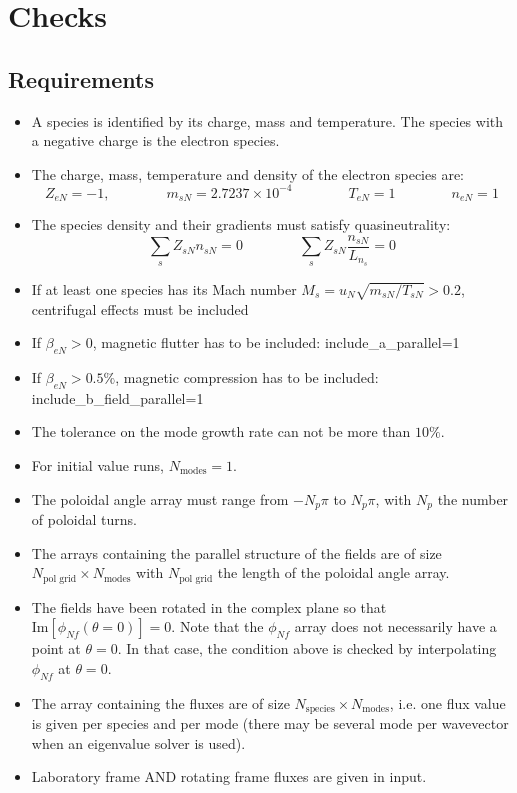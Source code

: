 \documentclass[a4paper]{report}
\begin{document}
\section{Checks}
\subsection{Requirements}
\begin{itemize}
\item A species is identified by its charge, mass and temperature. The species with a negative charge is the electron species.
\item The charge, mass, temperature and density of the electron species are:
\begin{equation}
 Z_{eN}=-1, \qquad \qquad m_{sN} = 2.7237\times 10^{-4} \qquad \qquad T_{eN}=1 \qquad \qquad n_{eN}=1
\end{equation}
\item The species density and their gradients must satisfy quasineutrality:
\begin{equation}
 \sum_s Z_{sN}n_{sN} = 0 \qquad \qquad \sum_s Z_{sN}\frac{n_{sN}}{L_{n_s}}=0
\end{equation}
\item If at least one species has its Mach number $M_s=u_N\sqrt{m_{sN}/T_{sN}}>0.2$, centrifugal effects must be included
\item If $\beta_{eN}>0$, magnetic flutter has to be included: include\_a\_parallel=1
\item If $\beta_{eN}>0.5\%$, magnetic compression has to be included: include\_b\_field\_parallel=1
\item The tolerance on the mode growth rate can not be more than $10\%$.
\item For initial value runs, $N_\textrm{modes}=1$.
\item The poloidal angle array must range from $-N_p \pi$ to $N_p \pi$, with $N_p$ the number of poloidal turns.
\item The arrays containing the parallel structure of the fields are of size $N_\textrm{pol grid}\times N_\textrm{modes}$ with $N_\textrm{pol grid}$ the length of the poloidal angle array.
\item The fields have been rotated in the complex plane so that $\textrm{Im}\left[\phi_{Nf}(\theta=0)\right]=0$. Note that the $\phi_{Nf}$ array does not necessarily have a point at $\theta=0$. In that case, the condition above is checked by interpolating $\phi_{Nf}$ at $\theta=0$.
\item The array containing the fluxes are of size $N_\textrm{species}\times N_\textrm{modes}$, i.e. one flux value is given per species and per mode (there may be several mode per wavevector when an eigenvalue solver is used).
\item Laboratory frame AND rotating frame fluxes are given in input.
\end{itemize}
\end{document}
